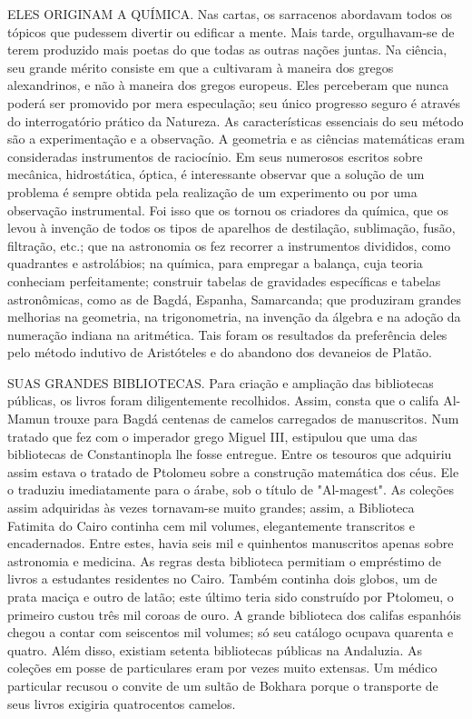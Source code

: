 \documentclass[11pt,a5paper,twoside,openany]{book}
\begin{document}
ELES ORIGINAM A QUÍMICA. Nas cartas, os sarracenos abordavam todos os tópicos que pudessem divertir ou edificar a mente. Mais tarde, orgulhavam-se de terem produzido mais poetas do que todas as outras nações juntas. Na ciência, seu grande mérito consiste em que a cultivaram à maneira dos gregos alexandrinos, e não à maneira dos gregos europeus. Eles perceberam que nunca poderá ser promovido por mera especulação; seu único progresso seguro é através do interrogatório prático da Natureza. As características essenciais do seu método são a experimentação e a observação. A geometria e as ciências matemáticas eram consideradas instrumentos de raciocínio. Em seus numerosos escritos sobre mecânica, hidrostática, óptica, é interessante observar que a solução de um problema é sempre obtida pela realização de um experimento ou por uma observação instrumental. Foi isso que os tornou os criadores da química, que os levou à invenção de todos os tipos de aparelhos de destilação, sublimação, fusão, filtração, etc.; que na astronomia os fez recorrer a instrumentos divididos, como quadrantes e astrolábios; na química, para empregar a balança, cuja teoria conheciam perfeitamente; construir tabelas de gravidades específicas e tabelas astronômicas, como as de Bagdá, Espanha, Samarcanda; que produziram grandes melhorias na geometria, na trigonometria, na invenção da álgebra e na adoção da numeração indiana na aritmética. Tais foram os resultados da preferência deles pelo método indutivo de Aristóteles e do abandono dos devaneios de Platão.

SUAS GRANDES BIBLIOTECAS. Para criação e ampliação das bibliotecas públicas, os livros foram diligentemente recolhidos. Assim, consta que o califa Al-Mamun trouxe para Bagdá centenas de camelos carregados de manuscritos. Num tratado que fez com o imperador grego Miguel III, estipulou que uma das bibliotecas de Constantinopla lhe fosse entregue. Entre os tesouros que adquiriu assim estava o tratado de Ptolomeu sobre a construção matemática dos céus. Ele o traduziu imediatamente para o árabe, sob o título de "Al-magest". As coleções assim adquiridas às vezes tornavam-se muito grandes; assim, a Biblioteca Fatimita do Cairo continha cem mil volumes, elegantemente transcritos e encadernados. Entre estes, havia seis mil e quinhentos manuscritos apenas sobre astronomia e medicina. As regras desta biblioteca permitiam o empréstimo de livros a estudantes residentes no Cairo. Também continha dois globos, um de prata maciça e outro de latão; este último teria sido construído por Ptolomeu, o primeiro custou três mil coroas de ouro. A grande biblioteca dos califas espanhóis chegou a contar com seiscentos mil volumes; só seu catálogo ocupava quarenta e quatro. Além disso, existiam setenta bibliotecas públicas na Andaluzia. As coleções em posse de particulares eram por vezes muito extensas. Um médico particular recusou o convite de um sultão de Bokhara porque o transporte de seus livros exigiria quatrocentos camelos.
\end{document}
